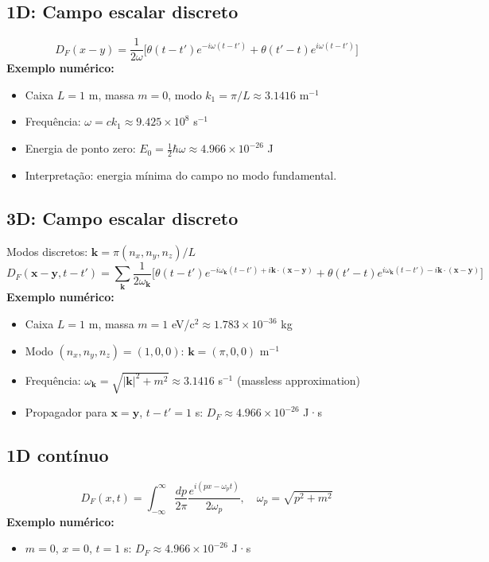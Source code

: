 \documentclass[12pt,a4paper]{article}
\begin{document}
\subsection{1D: Campo escalar discreto}
\begin{equation}
D_F(x-y) = \frac{1}{2\omega} \Big[ \theta(t-t') e^{-i\omega(t-t')} + \theta(t'-t) e^{i\omega(t-t')} \Big]
\end{equation}
\textbf{Exemplo numérico:}
\begin{itemize}
\item Caixa $L=1$ m, massa $m=0$, modo $k_1 = \pi/L \approx 3.1416$ m$^{-1}$
\item Frequência: $\omega = c k_1 \approx 9.425\times10^8$ s$^{-1}$
\item Energia de ponto zero: $E_0 = \frac{1}{2} \hbar \omega \approx 4.966 \times 10^{-26}$ J
\item Interpretação: energia mínima do campo no modo fundamental.
\end{itemize}

\subsection{3D: Campo escalar discreto}
Modos discretos: $\mathbf{k} = \pi(n_x,n_y,n_z)/L$
\begin{equation}
D_F(\mathbf{x}-\mathbf{y},t-t') = \sum_{\mathbf{k}} \frac{1}{2\omega_\mathbf{k}} \Big[ \theta(t-t') e^{-i\omega_\mathbf{k}(t-t') + i\mathbf{k}\cdot(\mathbf{x}-\mathbf{y})} + \theta(t'-t) e^{i\omega_\mathbf{k}(t-t') - i\mathbf{k}\cdot(\mathbf{x}-\mathbf{y})} \Big]
\end{equation}
\textbf{Exemplo numérico:}
\begin{itemize}
\item Caixa $L=1$ m, massa $m=1$ eV/c$^2 \approx 1.783\times10^{-36}$ kg
\item Modo $(n_x,n_y,n_z)=(1,0,0)$: $\mathbf{k}=(\pi,0,0)$ m$^{-1}$
\item Frequência: $\omega_\mathbf{k} = \sqrt{|\mathbf{k}|^2 + m^2} \approx 3.1416$ s$^{-1}$ (massless approximation)
\item Propagador para $\mathbf{x}=\mathbf{y}$, $t-t'=1$ s: $D_F \approx 4.966\times10^{-26}$ J·s
\end{itemize}

\subsection{1D contínuo}
\begin{equation}
D_F(x,t) = \int_{-\infty}^{\infty} \frac{dp}{2\pi} \frac{e^{i(px - \omega_p t)}}{2\omega_p}, \quad \omega_p = \sqrt{p^2 + m^2}
\end{equation}
\textbf{Exemplo numérico:}
\begin{itemize}
\item $m=0$, $x=0$, $t=1$ s: $D_F \approx 4.966\times10^{-26}$ J·s
\end{itemize}
\end{document}
